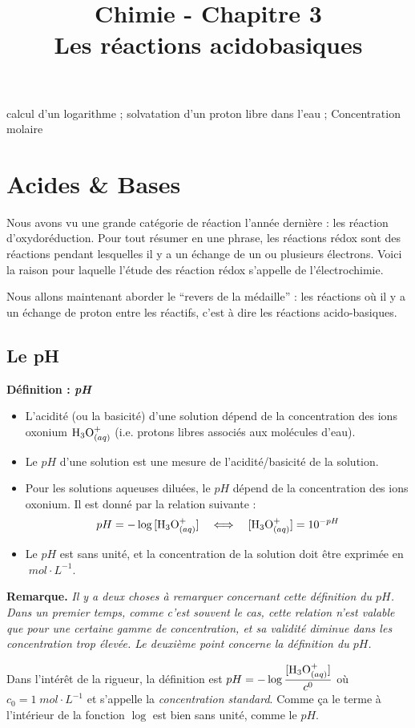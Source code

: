\documentclass[11pt,a4paper]{article}
\title{\large Chimie - Chapitre 3 \\ \LARGE  Les réactions acidobasiques}
\date{}
\author{}
\newcommand{\mpl}{\; mol\cdot L^{-1}}
\newcommand{\oxo}{\ce{H3O+}_{(aq)}}
\newenvironment{defn}[1]
 {\begin{leftbar}\noindent \textbf{Définition :\textit{ \quad #1}} } { \end{leftbar}}
\newenvironment{rmrq}
 {\begin{shaded} \textbf{Remarque.\quad } \itshape } { \end{shaded}}
\begin{document}
\maketitle
\vspace{-1cm}

\begin{tcolorbox}[title=Notions de la classe de première à rappeler]
calcul d'un logarithme ; solvatation d'un proton libre dans l'eau ; Concentration molaire
\end{tcolorbox}

\section*{Acides \& Bases}
Nous avons vu une grande catégorie de réaction l'année dernière : les réaction d'oxydoréduction. Pour tout résumer en une phrase, les réactions rédox sont des réactions pendant lesquelles il y a un échange de un ou plusieurs électrons. Voici la raison pour laquelle l'étude des réaction rédox s'appelle de l'électrochimie. 

Nous allons maintenant aborder le ``revers de la médaille'' : les réactions où il y a un échange de proton entre les réactifs, c'est à dire les réactions acido-basiques. 

\subsection*{Le pH}

\begin{defn}{pH }
\begin{itemize}
    \item L'acidité (ou la basicité) d'une solution dépend de la concentration des ions oxonium  $\oxo$ (i.e. protons libres associés aux molécules d’eau).
    \item Le $pH$ d'une solution est une mesure de l'acidité/basicité de la solution.
    \item Pour les solutions aqueuses diluées, le $pH$ dépend de la concentration des ions oxonium. Il est donné par la relation suivante : 
    \[  pH = -\log{[\oxo]} \quad \Longleftrightarrow \quad [\oxo] = 10^{-pH}\] 
    \item Le $pH$ est sans unité, et la concentration de la solution doit être exprimée en $\mpl$. 
\end{itemize}
\end{defn}

\begin{rmrq} Il y a deux choses à remarquer concernant cette définition du $pH$. Dans un premier temps, comme c'est souvent le cas, cette relation n'est valable que pour une certaine gamme de concentration, et sa validité diminue dans les concentration trop élevée. Le deuxième point concerne la définition du $pH$. 

Dans l'intérêt de la rigueur, la définition est $pH = -\log{\dfrac{[\oxo]}{c^0}}$ où $c_0 = 1\mpl$ et s'appelle la \emph{concentration standard}. Comme ça le terme à l'intérieur de la fonction $\log$ est bien sans unité, comme le $pH$. 
\end{rmrq}
\end{document}
